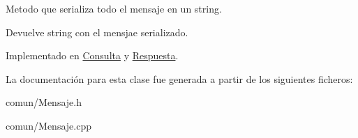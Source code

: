 \-Metodo que serializa todo el mensaje en un string. 

\begin{DoxyReturn}{\-Devuelve}
string con el mensjae serializado. 
\end{DoxyReturn}


\-Implementado en \hyperlink{classConsulta_a0d3fd7d84c1a68b8cbe31a4118150269}{\-Consulta} y \hyperlink{classRespuesta_a3705c87e5738e9612410cb3567caf54c}{\-Respuesta}.



\-La documentación para esta clase fue generada a partir de los siguientes ficheros\-:\begin{DoxyCompactItemize}
\item 
comun/\-Mensaje.\-h\item 
comun/\-Mensaje.\-cpp\end{DoxyCompactItemize}
